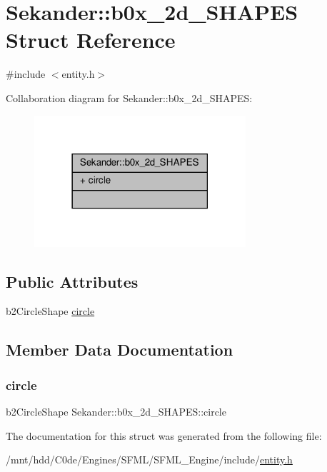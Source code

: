 \hypertarget{structSekander_1_1b0x__2d__SHAPES}{}\section{Sekander\+:\+:b0x\+\_\+2d\+\_\+\+S\+H\+A\+P\+ES Struct Reference}
\label{structSekander_1_1b0x__2d__SHAPES}


{\ttfamily \#include $<$entity.\+h$>$}



Collaboration diagram for Sekander\+:\+:b0x\+\_\+2d\+\_\+\+S\+H\+A\+P\+ES\+:
\nopagebreak
\begin{figure}[H]
\begin{center}
\leavevmode
\includegraphics[width=222pt]{structSekander_1_1b0x__2d__SHAPES__coll__graph}
\end{center}
\end{figure}
\subsection*{Public Attributes}
\begin{DoxyCompactItemize}
\item 
b2\+Circle\+Shape \hyperlink{structSekander_1_1b0x__2d__SHAPES_a568e7f02c413a6a3148c7d82ae153a90}{circle}
\end{DoxyCompactItemize}


\subsection{Member Data Documentation}
\mbox{\label{structSekander_1_1b0x__2d__SHAPES_a568e7f02c413a6a3148c7d82ae153a90}} 
\subsubsection{\texorpdfstring{circle}{circle}}
{\footnotesize\ttfamily b2\+Circle\+Shape Sekander\+::b0x\+\_\+2d\+\_\+\+S\+H\+A\+P\+E\+S\+::circle}



The documentation for this struct was generated from the following file\+:\begin{DoxyCompactItemize}
\item 
/mnt/hdd/\+C0de/\+Engines/\+S\+F\+M\+L/\+S\+F\+M\+L\+\_\+\+Engine/include/\hyperlink{entity_8h}{entity.\+h}\end{DoxyCompactItemize}
